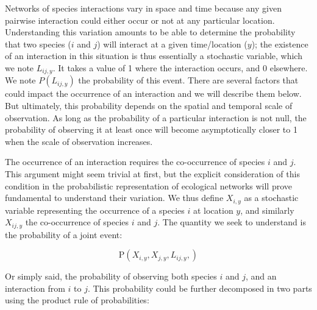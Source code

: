 \documentclass[12pt]{article}
\begin{document}

Networks of species interactions vary in space and time because any given
pairwise interaction could either occur or not at any particular location.
Understanding this variation amounts to be able to determine the probability
that two species ($i$ and $j$) will interact at a given time/location ($y$);
the existence of an interaction in this situation is thus essentially a
stochastic variable, which we note $L_{ij,y}$. It takes a value of 1 where the
interaction occurs, and 0 elsewhere. We note $P(L_{ij,y})$ the probability
of this event. There are several factors that could impact the occurrence
of an interaction and we will describe them below. But ultimately, this
probability depends on the spatial and temporal scale of observation. As long
as the probability of a particular interaction is not null, the probability
of observing it at least once will become asymptotically closer to 1 when
the scale of observation increases.

The occurrence of an interaction requires the co-occurrence of species $i$ and
$j$. This argument might seem trivial at first, but the explicit consideration
of this condition in the probabilistic representation of ecological networks
will prove fundamental to understand their variation.
We thus define $X_{i,y}$
as a stochastic variable representing the occurrence of a species $i$ at
location $y$, and similarly $X_{ij,y}$ the co-occurrence of species $i$ and
$j$. The quantity we seek to understand is the probability of a joint event:

\begin{equation}
\text{P}(X_{i,y},X_{j,y},L_{ij,y},)
\end{equation}

Or simply said, the probability of observing both species $i$ and $j$, and
an interaction from $i$ to $j$. This probability could be further decomposed
in two parts using the product rule of probabilities:
\end{document}
